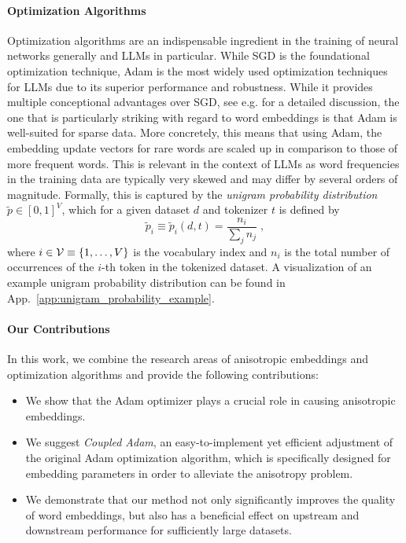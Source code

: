 \paragraph{Optimization Algorithms}
Optimization algorithms are an indispensable ingredient in the training of neural networks generally and LLMs in particular.
While SGD is the foundational optimization technique, Adam \cite{adam} is the most widely used optimization techniques for LLMs due to its superior performance and robustness.
While it provides multiple conceptional advantages over SGD, see e.g. \citet{ruder2017overviewgradientdescentoptimization} for a detailed discussion, the one that is particularly striking 
with regard to word embeddings is that Adam is well-suited for sparse data. More concretely, this means that using Adam, the embedding update vectors for rare words are scaled up in comparison to those of more frequent words. This is relevant in the context of LLMs as word frequencies in the training data are typically very skewed and may differ by several orders of magnitude.
Formally, this is captured by the {\em unigram probability distribution} $\widetilde{p} \in [0, 1]^V$, which for a given dataset $d$ and tokenizer $t$ is defined by
\begin{equation}
\widetilde{p}_i \equiv \widetilde{p}_i(d,t) = \frac{n_i}{\sum_j n_j} \; ,
\label{eq:unigram_probability}
\end{equation}
where $i \in \mathcal{V} \equiv \{1, \dots, V\}$
is the vocabulary index and $n_i$ is the total number of occurrences of the $i$-th token in the tokenized dataset. 
A visualization of an example unigram probability distribution can be found in App.~\ref{app:unigram_probability_example}.

\paragraph{Our Contributions}

In this work, we combine the research areas of anisotropic embeddings and optimization algorithms
and provide the following contributions:
\begin{itemize}
\item We show that the Adam optimizer plays a crucial role in causing anisotropic embeddings. 
\item We suggest \textit{Coupled Adam}, an easy-to-implement yet efficient adjustment of the original Adam optimization algorithm, which is specifically designed for embedding parameters in order to alleviate the anisotropy problem. 
\item We demonstrate that our method not only significantly improves the quality of word embeddings, but also has a beneficial effect on upstream and downstream performance for sufficiently large datasets.
\end{itemize}
